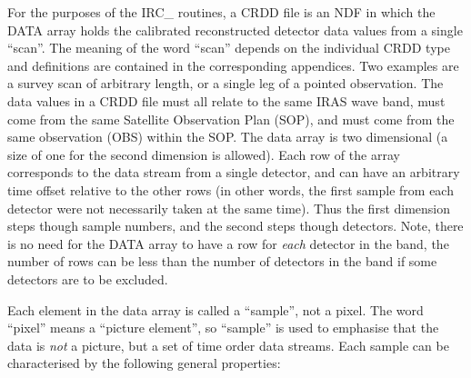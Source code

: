 For the purposes of the IRC\_ routines, a CRDD file is an NDF in which the DATA
array holds the calibrated reconstructed detector data values from a single
``scan''. The meaning of the word ``scan'' depends on the individual CRDD type
and definitions are contained in the corresponding appendices. Two examples are
a survey scan of arbitrary length, or a single leg of a pointed observation. The
data values in a CRDD file must all relate to the same IRAS wave band, must come
from the same Satellite Observation Plan (SOP), and must come from the same
observation (OBS) within the SOP. The data array is two dimensional (a size of
one for the second dimension is allowed). Each row of the array corresponds to
the data stream from a single detector, and can have an arbitrary time offset
relative to the other rows (in other words, the first sample from each detector
were not necessarily taken at the same time). Thus the first dimension steps
though sample numbers, and the second steps though detectors. Note, there is no
need for the DATA array to have a row for {\em each} detector in the band, the
number of rows can be less than the number of detectors in the band if some
detectors are to be excluded.

Each element in the data array is called a ``sample'', not a pixel. The word
``pixel'' means a ``picture element'', so ``sample'' is used to emphasise that
the data is {\em not} a picture, but a set of time order data streams. Each
sample can be characterised by the following general properties:

